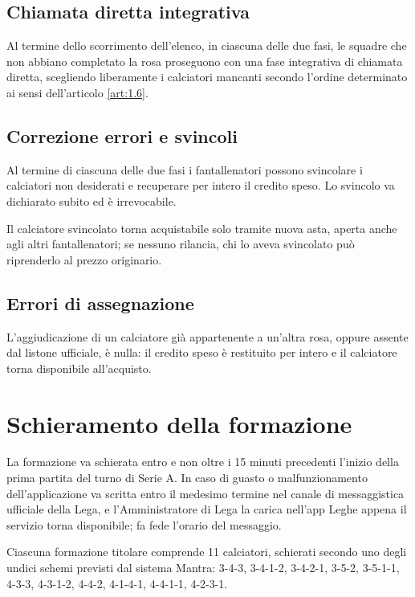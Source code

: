 \subsection{Chiamata diretta integrativa}
\label{art:4.3.4}

Al termine dello scorrimento dell'elenco, in ciascuna delle due fasi, le squadre che non abbiano completato la rosa proseguono con una fase integrativa di chiamata diretta, scegliendo liberamente i calciatori mancanti secondo l'ordine determinato ai sensi dell'articolo \ref{art:1.6}.

\subsection{Correzione errori e svincoli}
\label{art:4.3.5}

Al termine di ciascuna delle due fasi i fantallenatori possono svincolare i calciatori non desiderati e recuperare per intero il credito speso. Lo svincolo va dichiarato subito ed è irrevocabile.

Il calciatore svincolato torna acquistabile solo tramite nuova asta, aperta anche agli altri fantallenatori; se nessuno rilancia, chi lo aveva svincolato può riprenderlo al prezzo originario.

\subsection{Errori di assegnazione}
\label{art:4.3.6}

L'aggiudicazione di un calciatore già appartenente a un'altra rosa, oppure assente dal listone ufficiale, è nulla: il credito speso è restituito per intero e il calciatore torna disponibile all'acquisto.

\section{Schieramento della formazione}
\label{art:4.4}

La formazione va schierata entro e non oltre i 15 minuti precedenti l'inizio della prima partita del turno di Serie A. In caso di guasto o malfunzionamento dell'applicazione va scritta entro il medesimo termine nel canale di messaggistica ufficiale della Lega, e l'Amministratore di Lega la carica nell'app Leghe appena il servizio torna disponibile; fa fede l'orario del messaggio.

Ciascuna formazione titolare comprende 11 calciatori, schierati secondo uno degli undici schemi previsti dal sistema Mantra: 3-4-3, 3-4-1-2, 3-4-2-1, 3-5-2, 3-5-1-1, 4-3-3, 4-3-1-2, 4-4-2, 4-1-4-1, 4-4-1-1, 4-2-3-1.

